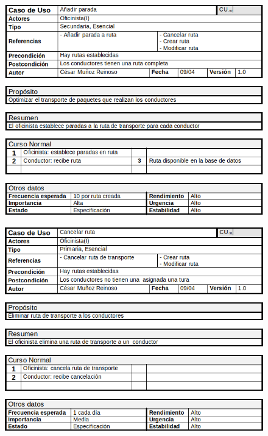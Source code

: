 \begin{figure}[H]
	\centering
	\includegraphics[width=16cm]{30}
\end{figure}
\begin{figure}[H]
	\centering
	\includegraphics[width=16cm]{31}
\end{figure}
